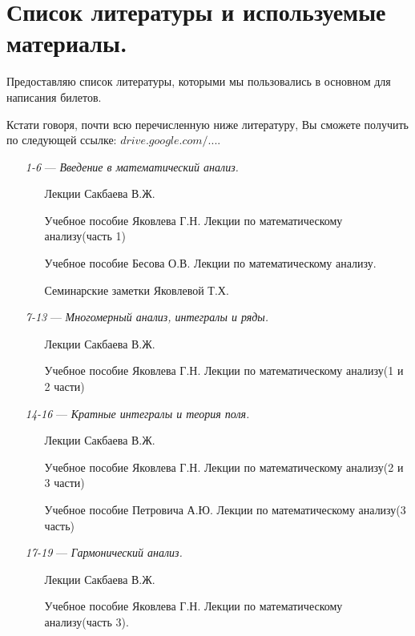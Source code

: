 \chapter{Список литературы и используемые материалы.}

Предоставляю список литературы, которыми мы пользовались в основном для написания билетов. 

Кстати говоря, почти всю перечисленную ниже литературу, Вы сможете получить по следующей ссылке: \href{https://drive.google.com/drive/u/0/folders/0BzuzEyNkpwYDcENXcV9jNWdwVlU}{$drive.google.com/...$}.

\begin{itemize}
\item[\textit{1-6}]
\; --- \: \textit{Введение в математический анализ.} 
\begin{itemize}
\item[\textbullet]
Лекции Сакбаева В.Ж.
\item[\textbullet]
Учебное пособие Яковлева Г.Н. \glqq Лекции по математическому анализу\grqq (часть 1)
\item[\textbullet]
Учебное пособие Бесова О.В. \glqq Лекции по математическому анализу\grqq.
\item[\textbullet]
Семинарские заметки Яковлевой Т.Х.
\end{itemize}

\item[\textit{7-13}] 
\; --- \: \textit{Многомерный анализ, интегралы и ряды.}
\begin{itemize}
\item[\textbullet]
Лекции Сакбаева В.Ж.
\item[\textbullet]
Учебное пособие Яковлева Г.Н. \glqq Лекции по математическому анализу\grqq (1 и 2 части)
\end{itemize}

\item[\textit{14-16}] 
\; --- \: \textit{Кратные интегралы и теория поля.}
\begin{itemize}
\item[\textbullet]
Лекции Сакбаева В.Ж.
\item[\textbullet]
Учебное пособие Яковлева Г.Н. \glqq Лекции по математическому анализу\grqq (2 и 3 части)
\item[\textbullet]
Учебное пособие Петровича А.Ю. \glqq Лекции по математическому анализу\grqq (3 часть)
\end{itemize}

\item[\textit{17-19}] 
\; --- \: \textit{Гармонический анализ.}
\begin{itemize}
\item[\textbullet]
Лекции Сакбаева В.Ж.
\item[\textbullet]
Учебное пособие Яковлева Г.Н. \glqq Лекции по математическому анализу\grqq  (часть 3).
\end{itemize}


\end{itemize}
